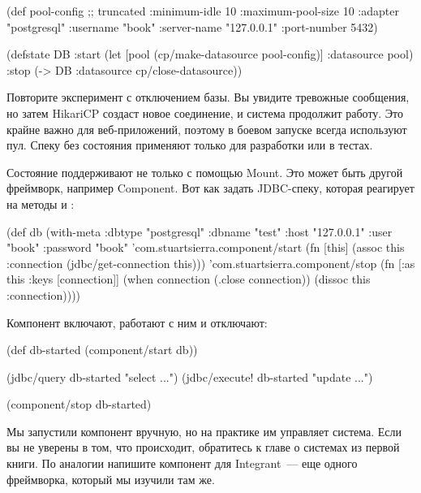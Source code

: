 \begin{english}
  \begin{clojure}
(def pool-config ;; truncated
  {:minimum-idle       10
   :maximum-pool-size  10
   :adapter            "postgresql"
   :username           "book"
   :server-name        "127.0.0.1"
   :port-number        5432})

(defstate DB
  :start
  (let [pool (cp/make-datasource pool-config)]
    {:datasource pool})
  :stop
  (-> DB :datasource cp/close-datasource))
  \end{clojure}
\end{english}

Повторите эксперимент с отключением базы. Вы увидите тревожные сообщения, но затем HikariCP создаст новое соединение, и система продолжит работу. Это крайне важно для веб-приложений, поэтому в боевом запуске всегда используют пул. Спеку без состояния применяют только для разработки или в тестах.

Состояние поддерживают не только с помощью Mount. Это может быть другой фреймворк, например Component. Вот как задать JDBC-спеку, которая реагирует на методы  и :

\begin{english}
  \begin{clojure}
(def db
  (with-meta
    {:dbtype "postgresql"
     :dbname "test"
     :host "127.0.0.1"
     :user "book"
     :password "book"}
    {'com.stuartsierra.component/start
     (fn [this]
       (assoc this :connection
              (jdbc/get-connection this)))
     'com.stuartsierra.component/stop
     (fn [{:as this :keys [connection]}]
       (when connection
         (.close connection))
       (dissoc this :connection))}))
  \end{clojure}
\end{english}

Компонент включают, работают с ним и отключают:

\begin{english}
  \begin{clojure}
(def db-started (component/start db))

(jdbc/query db-started "select ...")
(jdbc/execute! db-started "update ...")

(component/stop db-started)
  \end{clojure}
\end{english}


Мы запустили компонент вручную, но на практике им управляет система. Если вы не уверены в том, что происходит, обратитесь к главе о системах из первой книги. По аналогии напишите компонент для Integrant~--- еще одного фреймворка, который мы изучили там же.

